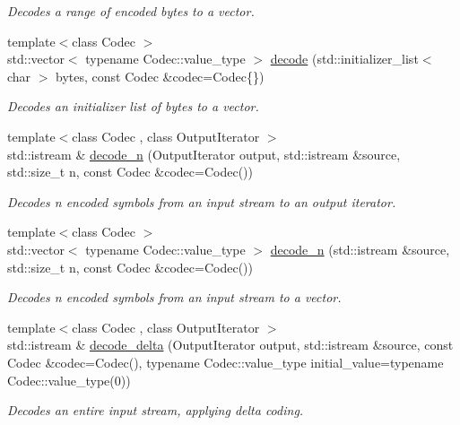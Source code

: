 \begin{DoxyCompactItemize}
\begin{DoxyCompactList}\small\item\em Decodes a range of encoded bytes to a vector. \end{DoxyCompactList}\item 
{\footnotesize template$<$class Codec $>$ }\\std\+::vector$<$ typename Codec\+::value\+\_\+type $>$ \mbox{\hyperlink{namespaceirk_1_1coding_abb7007b10914de62d5b89cd28b13d67e}{decode}} (std\+::initializer\+\_\+list$<$ char $>$ bytes, const Codec \&codec=Codec\{\})
\begin{DoxyCompactList}\small\item\em Decodes an initializer list of bytes to a vector. \end{DoxyCompactList}\item 
{\footnotesize template$<$class Codec , class Output\+Iterator $>$ }\\std\+::istream \& \mbox{\hyperlink{namespaceirk_1_1coding_a89b7865e53cb6def37c104625ff21844}{decode\+\_\+n}} (Output\+Iterator output, std\+::istream \&source, std\+::size\+\_\+t n, const Codec \&codec=Codec())
\begin{DoxyCompactList}\small\item\em Decodes {\ttfamily n} encoded symbols from an input stream to an output iterator. \end{DoxyCompactList}\item 
{\footnotesize template$<$class Codec $>$ }\\std\+::vector$<$ typename Codec\+::value\+\_\+type $>$ \mbox{\hyperlink{namespaceirk_1_1coding_af198bcc29586085b2a4ae2bf18f1fd2b}{decode\+\_\+n}} (std\+::istream \&source, std\+::size\+\_\+t n, const Codec \&codec=Codec())
\begin{DoxyCompactList}\small\item\em Decodes {\ttfamily n} encoded symbols from an input stream to a vector. \end{DoxyCompactList}\item 
{\footnotesize template$<$class Codec , class Output\+Iterator $>$ }\\std\+::istream \& \mbox{\hyperlink{namespaceirk_1_1coding_aedcc1c74d9530b8aaa51e1a88afcf7d6}{decode\+\_\+delta}} (Output\+Iterator output, std\+::istream \&source, const Codec \&codec=Codec(), typename Codec\+::value\+\_\+type initial\+\_\+value=typename Codec\+::value\+\_\+type(0))
\begin{DoxyCompactList}\small\item\em Decodes an entire input stream, applying delta coding. \end{DoxyCompactList}\item 

\end{DoxyCompactItemize}
